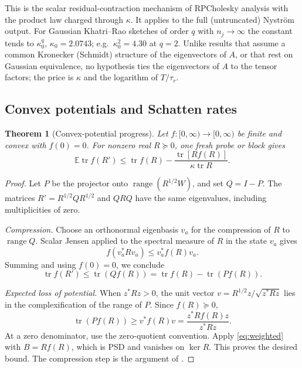 \documentclass[11pt,a4paper]{article}
\newtheorem{theorem}{Theorem}[section]
\theoremstyle{definition}\newtheorem{definition}[theorem]{Definition}
\theoremstyle{remark}\newtheorem{remark}[theorem]{Remark}
\numberwithin{equation}{section}
\newcommand{\E}{\mathbb E}
\newcommand{\tr}{\operatorname{tr}}
\newcommand{\range}{\operatorname{range}}
\begin{document}
This is the scalar residual-contraction mechanism of RPCholesky analysis
\cite{CETW} with the product law charged through $\kappa$. It applies to the
full (untruncated) Nystr\"om output. For Gaussian Khatri--Rao sketches of order
$q$ with $n_j\to\infty$ the constant tends to $\kappa_0^q$, $\kappa_0=2.0743$;
e.g.\ $\kappa_0^2=4.30$ at $q=2$. Unlike results that assume a common Kronecker (Schmidt) structure of the
eigenvectors of $A$, or that rest on Gaussian equivalence, no hypothesis ties
the eigenvectors of $A$ to the tensor factors; the
price is $\kappa$ and the logarithm of $T/\tau_r$.

\subsection{Convex potentials and Schatten rates}\label{sec:convex}
\begin{theorem}[Convex-potential progress]\label{thm:convex}
Let $f:[0,\infty)\to[0,\infty)$ be finite and convex with $f(0)=0$. For nonzero
real $R\succeq0$, one fresh probe or block gives
\begin{equation}\label{eq:convex}
 \E\tr f(R')\le\tr f(R)-\frac{\tr[Rf(R)]}{\kappa\tr R}.
\end{equation}
\end{theorem}
\begin{proof}
Let \(P\) be the projector onto \(\range(R^{1/2}W)\), and set \(Q=I-P\).
The matrices \(R'=R^{1/2}QR^{1/2}\) and \(QRQ\) have the same eigenvalues,
including multiplicities of zero.

\emph{Compression.}
Choose an orthonormal eigenbasis \(v_a\) for the compression of \(R\)
to \(\range Q\). Scalar Jensen applied to the spectral measure of \(R\)
in the state \(v_a\) gives
\[
 f(v_a^*Rv_a)\le v_a^*f(R)v_a.
\]
Summing and using \(f(0)=0\), we conclude
\[
 \tr f(R')\le\tr(Qf(R))
 =\tr f(R)-\tr(Pf(R)).
\]

\emph{Expected loss of potential.}
When \(z^*Rz>0\), the unit vector
\(v=R^{1/2}z/\sqrt{z^*Rz}\) lies in the complexification of the range of \(P\).
Since \(f(R)\succeq0\),
\[
 \tr(Pf(R))\ge v^*f(R)v
 =\frac{z^*Rf(R)z}{z^*Rz}.
\]
At a zero denominator, use the zero-quotient convention.
Apply \eqref{eq:weighted} with \(B=Rf(R)\), which is PSD and vanishes
on \(\ker R\). This proves the desired bound. The compression step
is the argument of \cite[Lemma~4.2]{Epperly}.
\end{proof}
\end{document}
